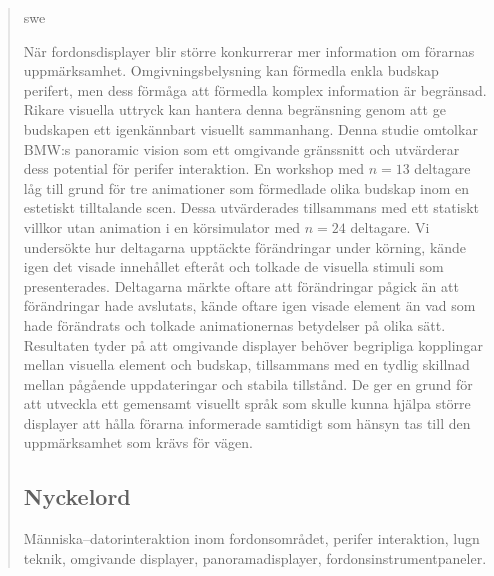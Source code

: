 \documentclass[
english,                 %
bibtex,                  %
includeExtraAbstracts, %
]{kththesis}
\numberwithin{listing}{chapter}
\begin{document}
\begin{abstract}
  \markboth{\abstractname}{}
\begin{scontents}[store-env=lang]
swe
\end{scontents}
\begin{scontents}[store-env=abstracts,print-env=true]
När fordonsdisplayer blir större konkurrerar mer information om förarnas uppmärksamhet. Omgivningsbelysning kan förmedla enkla budskap perifert, men dess förmåga att förmedla komplex information är begränsad. Rikare visuella uttryck kan hantera denna begränsning genom att ge budskapen ett igenkännbart visuellt sammanhang. Denna studie omtolkar BMW:s panoramic vision som ett omgivande gränssnitt och utvärderar dess potential för perifer interaktion. En workshop med $n = 13$ deltagare låg till grund för tre animationer som förmedlade olika budskap inom en estetiskt tilltalande scen. Dessa utvärderades tillsammans med ett statiskt villkor utan animation i en körsimulator med $n = 24$ deltagare. Vi undersökte hur deltagarna upptäckte förändringar under körning, kände igen det visade innehållet efteråt och tolkade de visuella stimuli som presenterades. Deltagarna märkte oftare att förändringar pågick än att förändringar hade avslutats, kände oftare igen visade element än vad som hade förändrats och tolkade animationernas betydelser på olika sätt. Resultaten tyder på att omgivande displayer behöver begripliga kopplingar mellan visuella element och budskap, tillsammans med en tydlig skillnad mellan pågående uppdateringar och stabila tillstånd. De ger en grund för att utveckla ett gemensamt visuellt språk som skulle kunna hjälpa större displayer att hålla förarna informerade samtidigt som hänsyn tas till den uppmärksamhet som krävs för vägen.
\end{scontents}
\subsection*{Nyckelord}
\begin{scontents}[store-env=keywords,print-env=true]
Människa–datorinteraktion inom fordonsområdet, perifer interaktion, lugn teknik, omgivande displayer, panoramadisplayer, fordonsinstrumentpaneler.
\end{scontents}
\end{abstract}
\clearpage
{}

\listoffigures
\clearpage

{\footnotesize\listoftables}
\clearpage
\end{document}

